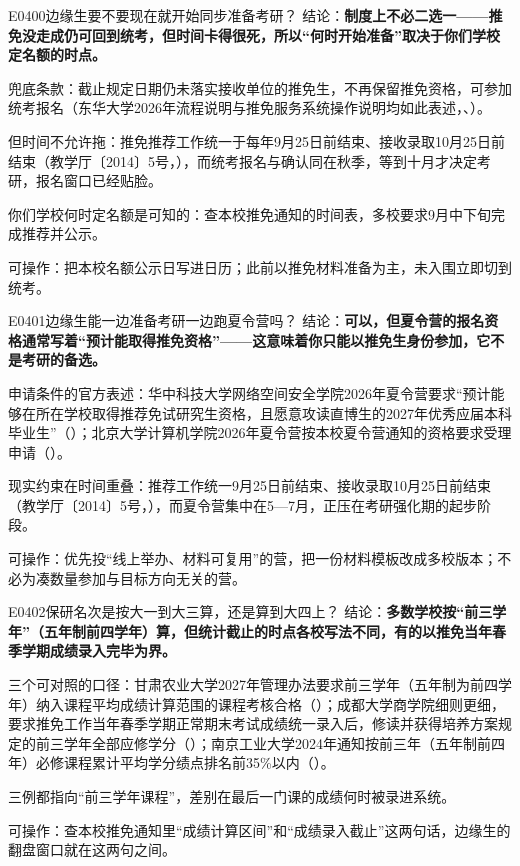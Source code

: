 \begin{qa}{E0400}{边缘生要不要现在就开始同步准备考研？}
结论：\textbf{制度上不必二选一——推免没走成仍可回到统考，但时间卡得很死，所以“何时开始准备”取决于你们学校定名额的时点。}

兜底条款：截止规定日期仍未落实接收单位的推免生，不再保留推免资格，可参加统考报名（东华大学2026年流程说明与推免服务系统操作说明均如此表述，、）。

但时间不允许拖：推免推荐工作统一于每年9月25日前结束、接收录取10月25日前结束（教学厅〔2014〕5号，），而统考报名与确认同在秋季，等到十月才决定考研，报名窗口已经贴脸。

你们学校何时定名额是可知的：查本校推免通知的时间表，多校要求9月中下旬完成推荐并公示。

可操作：把本校名额公示日写进日历；此前以推免材料准备为主，未入围立即切到统考。
\end{qa}

\begin{qa}{E0401}{边缘生能一边准备考研一边跑夏令营吗？}
结论：\textbf{可以，但夏令营的报名资格通常写着“预计能取得推免资格”——这意味着你只能以推免生身份参加，它不是考研的备选。}

申请条件的官方表述：华中科技大学网络空间安全学院2026年夏令营要求“预计能够在所在学校取得推荐免试研究生资格，且愿意攻读直博生的2027年优秀应届本科毕业生”（）；北京大学计算机学院2026年夏令营按本校夏令营通知的资格要求受理申请（）。

现实约束在时间重叠：推荐工作统一9月25日前结束、接收录取10月25日前结束（教学厅〔2014〕5号，），而夏令营集中在5—7月，正压在考研强化期的起步阶段。

可操作：优先投“线上举办、材料可复用”的营，把一份材料模板改成多校版本；不必为凑数量参加与目标方向无关的营。
\end{qa}

\begin{qa}{E0402}{保研名次是按大一到大三算，还是算到大四上？}
结论：\textbf{多数学校按“前三学年”（五年制前四学年）算，但统计截止的时点各校写法不同，有的以推免当年春季学期成绩录入完毕为界。}

三个可对照的口径：甘肃农业大学2027年管理办法要求前三学年（五年制为前四学年）纳入课程平均成绩计算范围的课程考核合格（）；成都大学商学院细则更细，要求推免工作当年春季学期正常期末考试成绩统一录入后，修读并获得培养方案规定的前三学年全部应修学分（）；南京工业大学2024年通知按前三年（五年制前四年）必修课程累计平均学分绩点排名前35\%以内（）。

三例都指向“前三学年课程”，差别在最后一门课的成绩何时被录进系统。

可操作：查本校推免通知里“成绩计算区间”和“成绩录入截止”这两句话，边缘生的翻盘窗口就在这两句之间。
\end{qa}

